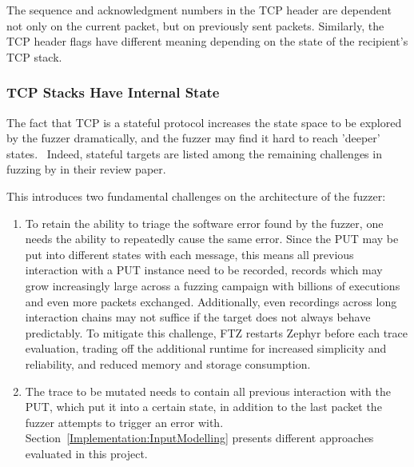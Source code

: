 \documentclass{article}
\newcommand{\proj}{FTZ\xspace}
\let\savedCite=\cite
\renewcommand{\cite}{\unskip~\savedCite}
\begin{document}
\begin{multicols}{2}
  The sequence and acknowledgment numbers in the TCP header are dependent not only on the current packet, but on previously sent packets. Similarly, the TCP header flags have different meaning depending on the state of the recipient's TCP stack.

  \subsubsection{TCP Stacks Have Internal State}
  \label{Background:TcpIsStateful}

  The fact that TCP is a stateful protocol increases the state space to be explored by the fuzzer dramatically, and the fuzzer may find it hard to reach 'deeper' states.\cite{StatefulReview} Indeed, stateful targets are listed among the remaining challenges in fuzzing by \citeauthor{ChallengesAndReflections} in their review paper.\cite{ChallengesAndReflections}

  This introduces two fundamental challenges on the architecture of the fuzzer:
  \begin{enumerate}
    \item To retain the ability to triage the software error found by the fuzzer, one needs the ability to repeatedly cause the same error. Since the PUT may be put into different states with each message, this means all previous interaction with a PUT instance need to be recorded, records which may grow increasingly large across a fuzzing campaign with billions of executions and even more packets exchanged. Additionally, even recordings across long interaction chains may not suffice if the target does not always behave predictably. To mitigate this challenge, \proj restarts Zephyr before each trace evaluation, trading off the additional runtime for increased simplicity and reliability, and reduced memory and storage consumption.
    \item The trace to be mutated needs to contain all previous interaction with the PUT, which put it into a certain state, in addition to the last packet the fuzzer attempts to trigger an error with. Section~\ref{Implementation:InputModelling} presents different approaches evaluated in this project.
  \end{enumerate}


\end{multicols}
\end{document}

